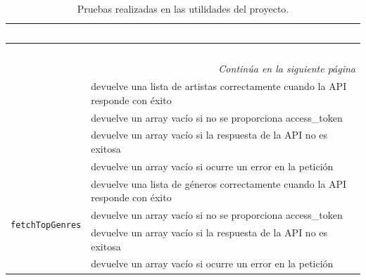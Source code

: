 \begin{longtable}{|p{5cm}|p{9cm}|}
    \caption{Pruebas realizadas en las utilidades del proyecto.} \label{tab:pruebas_utilidades}                                \\

    \hline
    \rowcolor[HTML]{E6B8CE}
    \textbf{\textcolor{white}{Utilidad}}       & \textbf{\textcolor{white}{Test}}                                              \\ \hline
    \endfirsthead

    \hline
    \rowcolor[HTML]{E6B8CE}
    \textbf{\textcolor{white}{Utilidad}}       & \textbf{\textcolor{white}{Test}}                                              \\ \hline
    \endhead

    \hline \multicolumn{2}{|r|}{\textit{Continúa en la siguiente página}}                                                      \\ \hline
    \endfoot

    \hline
    \endlastfoot

    \multirow{4}{*}{\texttt{fetchTopArtists}}  & devuelve una lista de artistas correctamente cuando la API responde con éxito \\ \cline{2-2}
                                               & devuelve un array vacío si no se proporciona access\_token                    \\ \cline{2-2}
                                               & devuelve un array vacío si la respuesta de la API no es exitosa               \\ \cline{2-2}
                                               & devuelve un array vacío si ocurre un error en la petición                     \\ \hline

    \multirow{4}{*}{\texttt{fetchTopGenres}}   & devuelve una lista de géneros correctamente cuando la API responde con éxito  \\ \cline{2-2}
                                               & devuelve un array vacío si no se proporciona access\_token                    \\ \cline{2-2}
                                               & devuelve un array vacío si la respuesta de la API no es exitosa               \\ \cline{2-2}
                                               & devuelve un array vacío si ocurre un error en la petición                     \\ \hline


\end{longtable}
